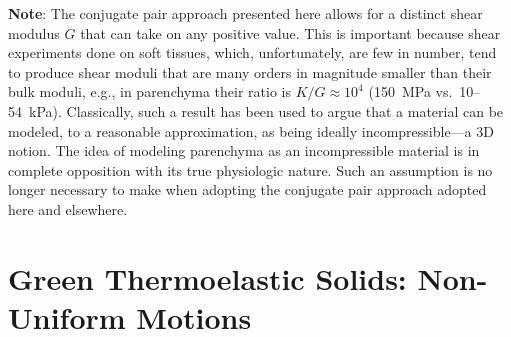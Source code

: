 \medskip\noindent
\textbf{Note}: 
The conjugate pair approach presented here allows for a distinct shear modulus $G$ that can take on any positive value.  This is important because shear experiments done on soft tissues, which, unfortunately, are few in number, tend to produce shear moduli that are many orders in magnitude smaller than their bulk moduli, e.g., in parenchyma their ratio is $K/G \approx 10^{4}$ (150~MPa vs.\ 10--54~kPa).  \cite{Sarafetal07}  Classically, such a result has been used to argue that a material can be modeled, to a reasonable approximation, as being ideally incompressible---a 3D notion.  The idea of modeling parenchyma as an incompressible material is in complete opposition with its true physiologic nature.  Such an assumption is no longer necessary to make when adopting the conjugate pair approach adopted here and elsewhere. \cite{Freedetal17,Freed17,FreedZamani19,Freedetal19,ClaytonFreed19,ClaytonFreed20,Freedetal20}

\section{Green Thermoelastic Solids: Non-Uniform Motions}
\label{secNonuniform3D}

